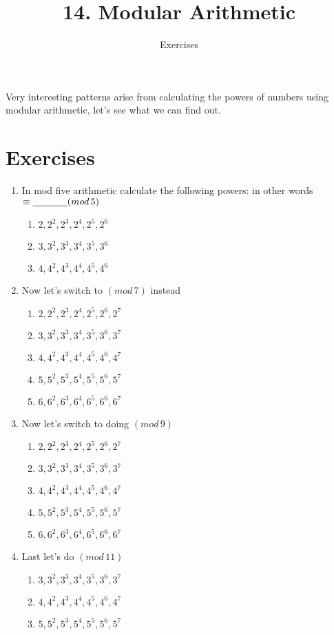 \documentclass[11pt]{article}
\title{14. Modular Arithmetic}
\author{Exercises}
\newcommand{\mblank}{\hbox{\underline{\hspace{0.5in}}}}
\begin{document}
\maketitle
Very interesting patterns arise from calculating the powers of numbers using modular arithmetic, let's see what we can find out.
\section*{Exercises}
\begin{enumerate}
	\item In mod five arithmetic calculate the following powers: in other words $ \equiv \mblank (mod\, 5)$
	\begin{enumerate}
		\item $2, 2^2, 2^3, 2^4, 2^5, 2^6$
		\item $3, 3^2, 3^3, 3^4, 3^5, 3^6$
		\item $4, 4^2, 4^3, 4^4, 4^5, 4^6$
	\end{enumerate}
	\item Now let's switch to $(mod \, 7)$ instead
	\begin{enumerate}
		\item $2, 2^2, 2^3, 2^4, 2^5, 2^6, 2^7$
		\item $3, 3^2, 3^3, 3^4, 3^5, 3^6, 3^7$
		\item $4, 4^2, 4^3, 4^4, 4^5, 4^6, 4^7$
		\item $5, 5^2, 5^3, 5^4, 5^5, 5^6, 5^7$
		\item $6, 6^2, 6^3, 6^4, 6^5, 6^6, 6^7$
	\end{enumerate}
	\item Now let's switch to doing $(mod \, 9)$
	\begin{enumerate}
		\item $2, 2^2, 2^3, 2^4, 2^5, 2^6, 2^7$
		\item $3, 3^2, 3^3, 3^4, 3^5, 3^6, 3^7$
		\item $4, 4^2, 4^3, 4^4, 4^5, 4^6, 4^7$
		\item $5, 5^2, 5^3, 5^4, 5^5, 5^6, 5^7$
		\item $6, 6^2, 6^3, 6^4, 6^5, 6^6, 6^7$
	\end{enumerate}
	\item Last let's do $(mod \, 11)$
	\begin{enumerate}
		\item $3, 3^2, 3^3, 3^4, 3^5, 3^6, 3^7$
		\item $4, 4^2, 4^3, 4^4, 4^5, 4^6, 4^7$
		\item $5, 5^2, 5^3, 5^4, 5^5, 5^6, 5^7$
	\end{enumerate}
\end{enumerate}
\newpage
\end{document}
